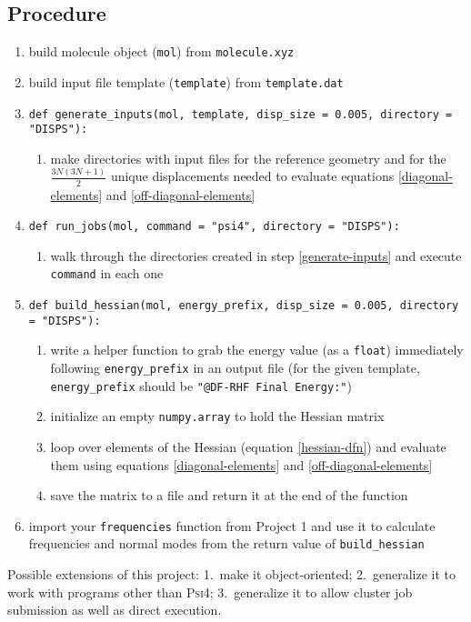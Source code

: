 \documentclass[fleqn]{article}
\newcommand{\linl}[1]{\lstinline{#1}{}}
\begin{document}
\subsection*{Procedure}

\begin{enumerate}
  \item build molecule object (\linl{mol}) from \linl{molecule.xyz}
  \item build input file template (\linl{template}) from \linl{template.dat}
  \item\label{generate-inputs}
  \linl{def generate_inputs(mol, template, disp_size = 0.005, directory = "DISPS"):}
  \begin{enumerate}
    \item make directories with input files for the reference geometry and for the $\tfrac{3N(3N+1)}{2}$ unique displacements needed to evaluate equations \ref{diagonal-elements} and \ref{off-diagonal-elements}
  \end{enumerate}
  \item \linl{def run_jobs(mol, command = "psi4", directory = "DISPS"):}
  \begin{enumerate}
    \item walk through the directories created in step \ref{generate-inputs} and execute \linl{command} in each one
  \end{enumerate}
  \item \linl{def build_hessian(mol, energy_prefix, disp_size = 0.005, directory = "DISPS"):}
  \begin{enumerate}
    \item write a helper function to grab the energy value (as a \linl{float}) immediately following \linl{energy_prefix} in an output file (for the given template, \linl{energy_prefix} should be \linl{"@DF-RHF Final Energy:"})
    \item initialize an empty \linl{numpy.array} to hold the Hessian matrix
    \item loop over elements of the Hessian (equation \ref{hessian-dfn}) and evaluate them using equations \ref{diagonal-elements} and \ref{off-diagonal-elements}
    \item save the matrix to a file and return it at the end of the function
  \end{enumerate}
  \item import your \linl{frequencies} function from Project 1 and use it to calculate frequencies and normal modes from the return value of \linl{build_hessian}
\end{enumerate}
Possible extensions of this project: 1.~make it object-oriented; 2.~generalize it to work with programs other than \textsc{Psi4}; 3.~generalize it to allow cluster job submission as well as direct execution.
\end{document}
